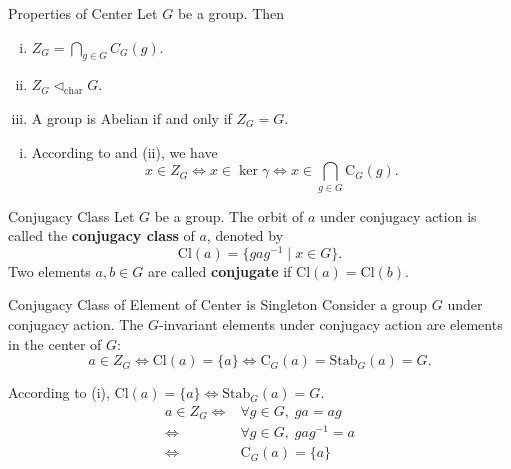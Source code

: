 \begin{proposition}{Properties of Center}{}
    Let $G$ be a group. Then
    \begin{enumerate}[(i)]
        \item $Z_G=\bigcap_{g \in G} C_G(g)$.
        \item $Z_G\lhd_{\mathrm{char}} G$.
        \item A group is Abelian if and only if $Z_G=G$.
    \end{enumerate}
\end{proposition}
\begin{prf}
    \begin{enumerate}[(i)]
        \item According to  and  (ii), we have
              \[
                  x\in Z_G\iff x\in \ker \gamma\iff x\in
                  \bigcap\limits_{g\in G}\mathrm{C}_G(g).
              \]
    \end{enumerate}
\end{prf}

\begin{definition}{Conjugacy Class}{}
    Let $G$ be a group. The orbit of $a$ under conjugacy action is called the \textbf{conjugacy class} of $a$, denoted by
    \[
        \mathrm{Cl}(a)=\{ gag^{-1}\mid x\in G   \}.
    \]
    Two elements $a,b\in G$ are called \textbf{conjugate} if $\mathrm{Cl}(a)=\mathrm{Cl}(b)$.
\end{definition}


\begin{proposition}{Conjugacy Class of Element of Center is Singleton}{}
    Consider a group $G$ under conjugacy action. The $G$-invariant elements under conjugacy action are elements in the center of $G$:
    \[
        a\in Z_G\iff \mathrm{Cl}(a)=\{ a\}\iff \mathrm{C}_G(a)=\mathrm{Stab}_G(a)=G.
    \]
\end{proposition}
\begin{prf}
    According to  (i), $\mathrm{Cl}(a)=\{ a\}\iff \mathrm{Stab}_G(a)=G$.
    $$
        \begin{aligned}
            a  \in Z_G \iff & \forall g \in G,\;g a  =a g     \\
            \iff            & \forall g \in G,\;g a g^{-1} =a \\
            \iff            & \mathrm{C}_G(a) =\{a\}
        \end{aligned}
    $$
\end{prf}

